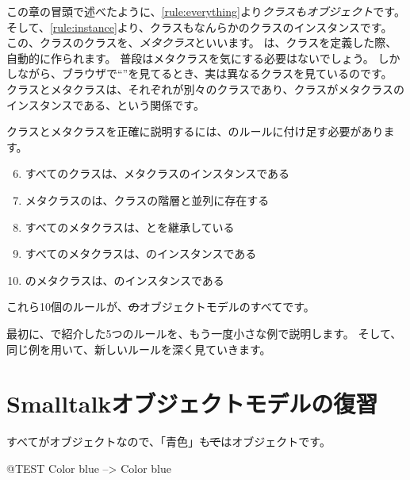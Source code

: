 \documentclass[a4paper,10pt,twoside]{book}
\begin{document}
この章の冒頭で述べたように、\ref{rule:everything}より\emph{クラスもオブジェクト}です。そして、\ref{rule:instance}より、クラスもなんらかのクラスのインスタンスです。
この、クラスのクラスを、\emph{メタクラス}といいます。
は、クラスを定義した際、自動的に作られます。
普段はメタクラスを気にする必要はないでしょう。
しかしながら、ブラウザで``''を見てるとき、実は異なるクラスを見ているのです。
クラスとメタクラスは、それぞれが別々のクラスであり、クラスがメタクラスのインスタンスである、という関係です。

クラスとメタクラスを正確に説明するには、のルールに付け足す必要があります。

\begin{enumerate}[label={\textbf{Rule \arabic{*}}.}, ref={Rule \arabic{*}}, leftmargin=*, widest=10]
\setcounter{enumi}{5}
\item{} 
	すべてのクラスは、メタクラスのインスタンスである

\item{} 
	メタクラスのは、クラスの階層と並列に存在する

\item{} 
	すべてのメタクラスは、とを継承している

\item{} 
	すべてのメタクラスは、のインスタンスである

\item{} 
	のメタクラスは、のインスタンスである

\end{enumerate}

\noindent
これら10個のルールが、\st のオブジェクトモデルのすべてです。

最初に、で紹介した5つのルールを、もう一度小さな例で説明します。
そして、同じ例を用いて、新しいルールを深く見ていきます。

\section{Smalltalkオブジェクトモデルの復習}

すべてがオブジェクトなので、「青色」も\st ではオブジェクトです。
\begin{code}{@TEST}
Color blue --> Color blue
\end{code}
\end{document}
